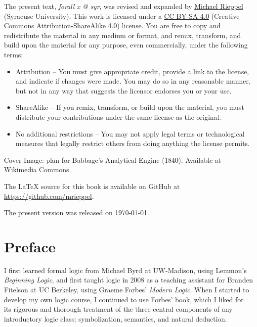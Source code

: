 \vspace{1ex}

\noindent The present text, \emph{forall x @ syr}, was revised and expanded by \href{https://mrieppel.net/}{Michael Rieppel} (Syracuse University).  This work is licensed under a \href{https://creativecommons.org/licenses/by-sa/4.0/}{CC BY-SA 4.0} (Creative Commons Attribution-ShareAlike 4.0) license.  You are free to copy and redistribute the material in any medium or format, and  remix, transform, and build upon the material for any purpose, even commercially, under the following terms:
\begin{itemize}
\item Attribution -- You must give appropriate credit, provide a link to the license, and indicate if changes were made. You may do so in any reasonable manner, but not in any way that suggests the licensor endorses you or your use.

\item ShareAlike -- If you remix, transform, or build upon the material, you must distribute your contributions under the same license as the original.

\item No additional restrictions -- You may not apply legal terms or technological measures that legally restrict others from doing anything the license permits.
\end{itemize}

\vspace{1ex}
\noindent Cover Image: plan for Babbage's Analytical Engine (1840). Available at Wikimedia Commons.

\vspace{1ex}

\noindent The \LaTeX{} source for this book is available on GitHub at \href{https://github.com/mrieppel}{https://github.com/mrieppel}. 

\vspace{1ex}

\noindent The present version was released on \today.


\newpage
\normalsize
\chapter*{Preface}

I first learned formal logic from Michael Byrd at UW-Madison, using Lemmon's  \emph{Beginning Logic}, and first taught logic in 2008 as a teaching assistant for Branden Fitelson at UC Berkeley, using Graeme Forbes' \emph{Modern Logic}.  When I started to develop my own logic course, I continued to use Forbes' book, which I liked for its rigorous and thorough treatment of the three central components of any introductory logic class: symbolization, semantics, and natural deduction.  

